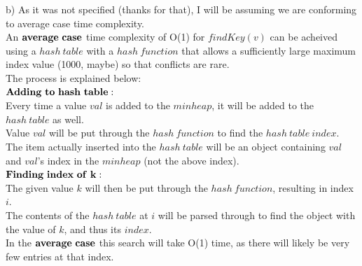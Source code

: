 \documentclass[12pt]{article}
\begin{document}
\noindent b) As it was not specified (thanks for that), I will be assuming we are conforming to average case time complexity.\\
An $\bold{average\ case}$ time complexity of O(1) for $findKey(v)$ can be acheived using a $hash\ table$ with a $hash\ function$ that allows a sufficiently large maximum index value (1000, maybe) so that conflicts are rare.\\
The process is explained below:\\

\noindent $\bold{Adding\ to\ hash\ table:}$\\
Every time a value $val$ is added to the $minheap$, it will be added to the $hash\ table$ as well.\\
Value $val$ will be put through the $hash\ function$ to find the $hash\ table\ index$.\\
The item actually inserted into the $hash\ table$ will be an object containing $val$ and $val$'s index in the $minheap$ (not the above index).\\

\noindent $\bold{Finding\ index\ of\ k:}$\\
The given value $k$ will then be put through the $hash\ function$, resulting in index $i$.\\
The contents of the $hash\ table$ at $i$ will be parsed through to find the object with the value of $k$, and thus its $index$.\\
In the $\bold{average\ case}$ this search will take O(1) time, as there will likely be very few entries at that index.
\end{document}
